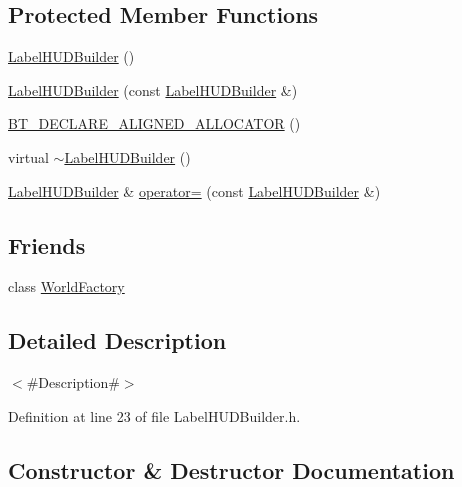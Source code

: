 \subsection*{Protected Member Functions}
\begin{DoxyCompactItemize}
\item 
\mbox{\hyperlink{classnjli_1_1_label_h_u_d_builder_ac3059bbfa1a2f136e1a8ae133a000a08}{Label\+H\+U\+D\+Builder}} ()
\item 
\mbox{\hyperlink{classnjli_1_1_label_h_u_d_builder_a0da59c21d965f7a4e8447e1a75952b90}{Label\+H\+U\+D\+Builder}} (const \mbox{\hyperlink{classnjli_1_1_label_h_u_d_builder}{Label\+H\+U\+D\+Builder}} \&)
\item 
\mbox{\hyperlink{classnjli_1_1_label_h_u_d_builder_a857ee8ed1e618b0bed1cfe4d9fd222f7}{B\+T\+\_\+\+D\+E\+C\+L\+A\+R\+E\+\_\+\+A\+L\+I\+G\+N\+E\+D\+\_\+\+A\+L\+L\+O\+C\+A\+T\+OR}} ()
\item 
virtual \mbox{\hyperlink{classnjli_1_1_label_h_u_d_builder_ac25cad6374d56fed41ac33b362c72514}{$\sim$\+Label\+H\+U\+D\+Builder}} ()
\item 
\mbox{\hyperlink{classnjli_1_1_label_h_u_d_builder}{Label\+H\+U\+D\+Builder}} \& \mbox{\hyperlink{classnjli_1_1_label_h_u_d_builder_afa9f56518339977a34b3591162634696}{operator=}} (const \mbox{\hyperlink{classnjli_1_1_label_h_u_d_builder}{Label\+H\+U\+D\+Builder}} \&)
\end{DoxyCompactItemize}
\subsection*{Friends}
\begin{DoxyCompactItemize}
\item 
class \mbox{\hyperlink{classnjli_1_1_label_h_u_d_builder_acb96ebb09abe8f2a37a915a842babfac}{World\+Factory}}
\end{DoxyCompactItemize}


\subsection{Detailed Description}
$<$\#\+Description\#$>$ 

Definition at line 23 of file Label\+H\+U\+D\+Builder.\+h.



\subsection{Constructor \& Destructor Documentation}
\mbox{\label{classnjli_1_1_label_h_u_d_builder_ac3059bbfa1a2f136e1a8ae133a000a08}} 
